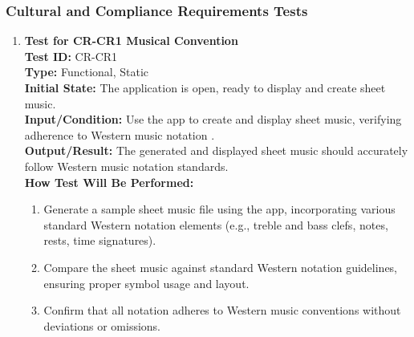 \documentclass[12pt, titlepage]{article}
\begin{document}
\subsubsection{Cultural and Compliance Requirements Tests}
\label{CR}
\begin{enumerate}
    \item \textbf{Test for CR-CR1 Musical Convention} \\
      \newline
      \textbf{Test ID:} CR-CR1 \\
      \textbf{Type:} Functional, Static \\
      \textbf{Initial State:} The application is open, ready to display and create sheet music. \\
      \textbf{Input/Condition:} Use the app to create and display sheet music, verifying adherence to Western music notation 
      \citep*{music-notation}. \\
      \textbf{Output/Result:} The generated and displayed sheet music should accurately follow Western music notation standards. \\
      \textbf{How Test Will Be Performed:}
      \begin{enumerate}
          \item Generate a sample sheet music file using the app, incorporating various standard Western notation elements 
          (e.g., treble and bass clefs, notes, rests, time signatures).
          \item Compare the sheet music against standard Western notation guidelines, ensuring proper symbol usage and layout.
          \item Confirm that all notation adheres to Western music conventions without deviations or omissions.
      \end{enumerate}


\end{enumerate}
\end{document}
